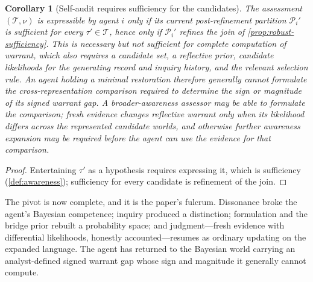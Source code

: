 \documentclass[11pt]{article}
\newtheorem{corollary}[assumption]{Corollary}
\theoremstyle{definition}
\begin{document}
\begin{corollary}[Self-audit requires sufficiency for the candidates]
\label{cor:self-audit}
The assessment $(\mathcal T,\nu)$ is expressible by agent $i$ only if its current post-refinement partition $\mathcal P_i'$ is sufficient for every $\tau'\in\mathcal T$, hence only if $\mathcal P_i'$ refines the join of \cref{prop:robust-sufficiency}.
This is necessary but not sufficient for complete computation of warrant, which also requires a candidate set, a reflective prior, candidate likelihoods for the generating record and inquiry history, and the relevant selection rule.
An agent holding a minimal restoration therefore generally cannot formulate the cross-representation comparison required to determine the sign or magnitude of its signed warrant gap.
A broader-awareness assessor may be able to formulate the comparison; fresh evidence changes reflective warrant only when its likelihood differs across the represented candidate worlds, and otherwise further awareness expansion may be required before the agent can use the evidence for that comparison.
\end{corollary}

\begin{proof}
Entertaining $\tau'$ as a hypothesis requires expressing it, which is sufficiency (\cref{def:awareness}); sufficiency for every candidate is refinement of the join.
\end{proof}

The pivot is now complete, and it is the paper's fulcrum.
Dissonance broke the agent's Bayesian competence; inquiry produced a distinction; formulation and the bridge prior rebuilt a probability space; and judgment---fresh evidence with differential likelihoods, honestly accounted---resumes as ordinary updating on the expanded language.
The agent has returned to the Bayesian world carrying an analyst-defined signed warrant gap whose sign and magnitude it generally cannot compute.
\end{document}
